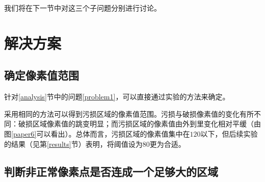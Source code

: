 \documentclass[UTF8]{ctexart}
\begin{document}
	\indent 我们将在下一节中对这三个子问题分别进行讨论。
	
	

	
	\section{解决方案}
		\subsection{确定像素值范围}
		
			\indent 针对\ref{analysis}节中的问题\ref{problem1}，可以直接通过实验的方法来确定。
%			
%			
%		
%			
%			
%			
%		
		
			\indent 采用相同的方法可以得到污损区域的像素值范围。污损与破损像素值的变化有所不同：破损区域像素值的跳变明显；而污损区域的像素值由外到里变化相对平缓（由图\ref{paper6}可以看出）。总体而言，污损区域的像素值集中在$120$以下，但后续实验的结果（见第\ref{results}节）表明，将阈值设为$80$更为合适。
		\subsection{判断非正常像素点是否连成一个足够大的区域}
			
\end{document}
